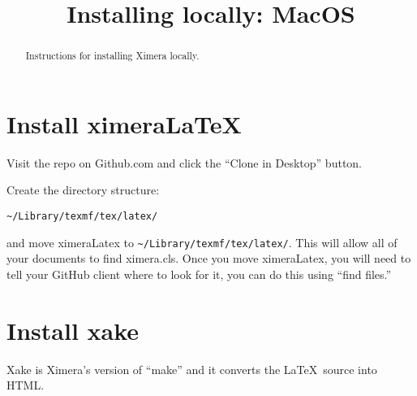 \documentclass{ximera}
\title{Installing locally: MacOS}
\begin{document}
\begin{abstract}
Instructions for installing Ximera locally.
\end{abstract}
\maketitle


\section{Install ximeraLaTeX}


Visit the repo on Github.com  and click the
``Clone in Desktop'' button.


Create the directory structure:

\begin{verbatim}
~/Library/texmf/tex/latex/
\end{verbatim}

and move ximeraLatex to \verb|~/Library/texmf/tex/latex/|. This will allow
all of your documents to find ximera.cls. Once you move ximeraLatex,
you will need to tell your GitHub client where to look for it, you can
do this using ``find files.''





\section{Install xake}

Xake is Ximera's version of ``make'' and it converts the
\LaTeX\ source into HTML.
\end{document}
